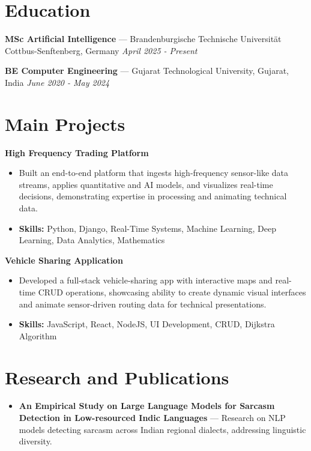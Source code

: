 \documentclass[a4paper,10pt]{article}
\begin{document}
\section*{Education}
\textbf{MSc Artificial Intelligence} — Brandenburgische Technische Universität Cottbus-Senftenberg, Germany \hfill \textit{April 2025 - Present}\par
\vspace{1.5pt}
\textbf{BE Computer Engineering} — Gujarat Technological University, Gujarat, India \hfill \textit{June 2020 - May 2024}\par

\section*{Main Projects}
\textbf{High Frequency Trading Platform}\par
\vspace{1pt}
\begin{itemize}
  \item Built an end-to-end platform that ingests high-frequency sensor-like data streams, applies quantitative and AI models, and visualizes real-time decisions, demonstrating expertise in processing and animating technical data.
  \item \textbf{Skills:} Python, Django, Real-Time Systems, Machine Learning, Deep Learning, Data Analytics, Mathematics
\end{itemize}
\vspace{3pt}
\textbf{Vehicle Sharing Application}\par
\vspace{1pt}
\begin{itemize}
  \item Developed a full-stack vehicle-sharing app with interactive maps and real-time CRUD operations, showcasing ability to create dynamic visual interfaces and animate sensor-driven routing data for technical presentations.
  \item \textbf{Skills:} JavaScript, React, NodeJS, UI Development, CRUD, Dijkstra Algorithm
\end{itemize}

\section*{Research and Publications}
\begin{itemize}
\item \textbf{An Empirical Study on Large Language Models for Sarcasm Detection in Low-resourced Indic Languages} — Research on NLP models detecting sarcasm across Indian regional dialects, addressing linguistic diversity.
\end{itemize}
\end{document}
